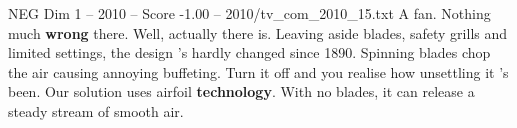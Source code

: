 \begin{textsample}{NEG Dim 1 – 2010 – Score -1.00 – 2010/tv\_com\_2010\_15.txt}  \label{ex:f1_neg_037}
A fan.
Nothing much \textbf{wrong} there.
Well, actually there is.
Leaving aside blades, safety grills and limited settings, the design 's hardly changed since 1890.
Spinning blades chop the air causing annoying buffeting.
Turn it off and you realise how unsettling it 's been.
Our solution uses airfoil \textbf{technology}.
With no blades, it can release a steady stream of smooth air.

\end{textsample}
